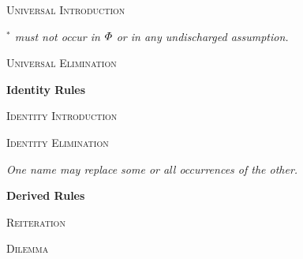 \textsc{Universal Introduction}


\begin{ndproof}
	 
\end{ndproof}

\begin{footnotesize}\emph{
$^\ast$  must not occur in $\varPhi{}$ or in any undischarged assumption.}
\end{footnotesize}



\textsc{Universal Elimination}

\begin{ndproof}
	 
\end{ndproof}




{\large \bf Identity Rules}

\textsc{Identity Introduction}
\begin{ndproof}
	 
\end{ndproof}


\textsc{Identity Elimination}
\begin{ndproof}
	 
	 
\end{ndproof}

\begin{footnotesize}\emph{One name may replace some or all occurrences of the other.}
\end{footnotesize}





\newpage

{\large \bf Derived Rules}

\textsc{Reiteration}

\begin{ndproof}
	 
\end{ndproof}


\textsc{Dilemma}

\begin{ndproof}
	 
\end{ndproof}

